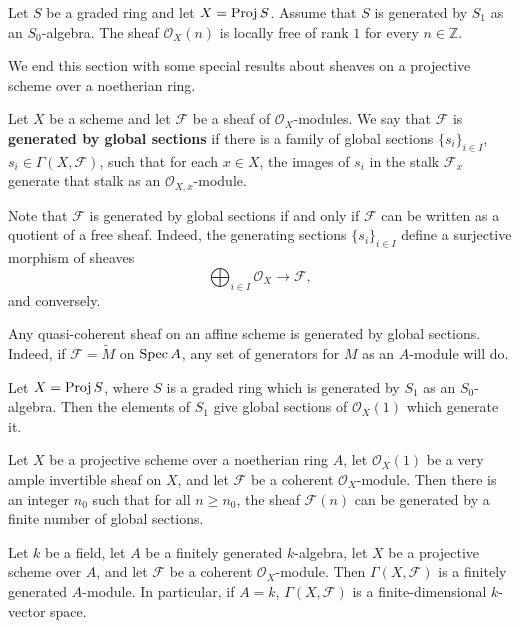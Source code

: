 \documentclass[12pt]{article}
\begin{document}
\begin{proposition}
    Let $S$ be a graded ring and let $X = \operatorname{Proj} S$. Assume that $S$ is generated by $S_1$ as an $S_0$-algebra. The sheaf $\mathcal O_X(n)$ is locally free of rank $1$ for every $n \in \mathbb Z$.
\end{proposition}

We end this section with some special results about sheaves on a projective scheme over a noetherian ring.

\begin{definition}
    Let $X$ be a scheme and let $\mathcal F$ be a sheaf of $\mathcal O_X$-modules. We say that $\mathcal F$ is \textbf{generated by global sections} if there is a family of global sections $\{s_i\}_{i \in I}$, $s_i \in \Gamma(X,\mathcal F)$, such that for each $x \in X$, the images of $s_i$ in the stalk $\mathcal F_x$ generate that stalk as an $\mathcal O_{X,x}$-module.

    Note that $\mathcal F$ is generated by global sections if and only if $\mathcal F$ can be written as a quotient of a free sheaf. Indeed, the generating sections $\{s_i\}_{i\in I}$ define a surjective morphism of sheaves
    \[
        \bigoplus_{i\in I} \mathcal O_X \longrightarrow \mathcal F,
    \]
    and conversely.
\end{definition}

\begin{example}
    Any quasi-coherent sheaf on an affine scheme is generated by global sections. Indeed, if $\mathcal F = \widetilde M$ on $\operatorname{Spec} A$, any set of generators for $M$ as an $A$-module will do.
\end{example}

\begin{example}
    Let $X = \operatorname{Proj} S$, where $S$ is a graded ring which is generated by $S_1$ as an $S_0$-algebra. Then the elements of $S_1$ give global sections of $\mathcal O_X(1)$ which generate it.
\end{example}

\begin{theorem}[Serre]
    Let $X$ be a projective scheme over a noetherian ring $A$, let $\mathcal O_X(1)$ be a very ample invertible sheaf on $X$, and let $\mathcal F$ be a coherent $\mathcal O_X$-module. Then there is an integer $n_0$ such that for all $n \ge n_0$, the sheaf $\mathcal F(n)$ can be generated by a finite number of global sections.
\end{theorem}

\begin{theorem}
    Let $k$ be a field, let $A$ be a finitely generated $k$-algebra, let $X$ be a projective scheme over $A$, and let $\mathcal F$ be a coherent $\mathcal O_X$-module. Then $\Gamma(X,\mathcal F)$ is a finitely generated $A$-module. In particular, if $A=k$, $\Gamma(X,\mathcal F)$ is a finite-dimensional $k$-vector space.
\end{theorem}
\end{document}
